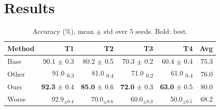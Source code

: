 \documentclass{article}
\begin{document}
\begin{abstract}
Our method reaches 92.3\% accuracy on T1 and an average of 90.0 across the four tasks.
\end{abstract}
\section{Results}
\begin{table}[h]\centering\caption{Accuracy (\%), mean $\pm$ std over 5 seeds. Bold: best.}
\begin{tabular}{lrrrrr}
\toprule
Method & T1 & T2 & T3 & T4 & Avg \\
\midrule
Base & 90.1 $\pm$ 0.3 & 80.2 $\pm$ 0.5 & 70.3 $\pm$ 0.2 & 60.4 $\pm$ 0.4 & 75.3 \\
Other & 91.0 \textsubscript{0.3} & 81.0 \textsubscript{0.4} & 71.0 \textsubscript{0.2} & 61.0 \textsubscript{0.4} & 76.0 \\
Ours & \textbf{92.3} ± 0.4 & \textbf{85.0} ± 0.6 & \textbf{72.0} ± 0.3 & \textbf{63.0} ± 0.5 & 80.0 \\
Worse & 92.9$_{\pm 0.4}$ & 70.0$_{\pm 0.6}$ & 60.0$_{\pm 0.3}$ & 50.0$_{\pm 0.5}$ & 68.2 \\
\bottomrule
\end{tabular}\end{table}
\end{document}
